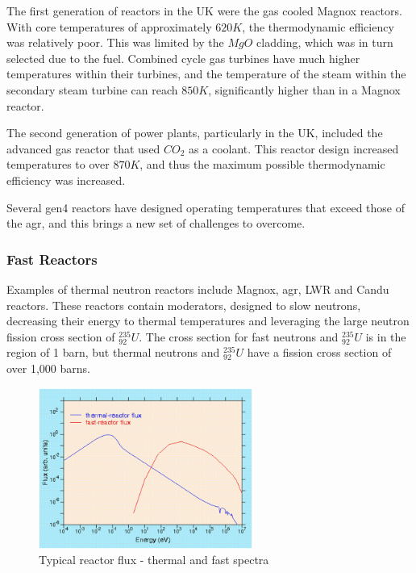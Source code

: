 The first generation of reactors in the UK were the gas cooled Magnox reactors.  With core temperatures of approximately $620K$\cite{magnoxtemp}, the thermodynamic efficiency  was relatively poor.  This was limited by the $MgO$ cladding, which was in turn selected due to the fuel.  Combined cycle gas turbines have much higher temperatures within their turbines, and the temperature of the steam within the secondary steam turbine can reach $850K$\cite{ccppwiki}, significantly higher than in a Magnox reactor.

The second generation of power plants, particularly in the UK, included the advanced gas reactor that used $CO_2$ as a coolant.  This reactor design increased temperatures to over $870K$, and thus the maximum possible thermodynamic efficiency was increased.

Several \acrshort{gen4} reactors have designed operating temperatures that exceed those of the \acrshort{agr}, and this brings a new set of challenges to overcome.



\subsubsection{Fast Reactors}

Examples of thermal neutron reactors include Magnox, \acrshort{agr}, LWR and Candu reactors.  These reactors contain moderators, designed to slow neutrons, decreasing their energy to thermal temperatures and leveraging the large neutron fission cross section of ${}^{235}_{92}U$.  The cross section for fast neutrons and ${}^{235}_{92}U$ is in the region of 1 barn, but thermal neutrons and ${}^{235}_{92}U$ have a fission cross section of over 1,000 barns.

\begin{figure}[htbp]
  \begin{center}
    \includegraphics[width=7.0cm]{chapters/introduction/images/reactor-flux.png}
    \caption{Typical reactor flux - thermal and fast spectra}
    \label{fig:flux1}
  \end{center}
\end{figure}

